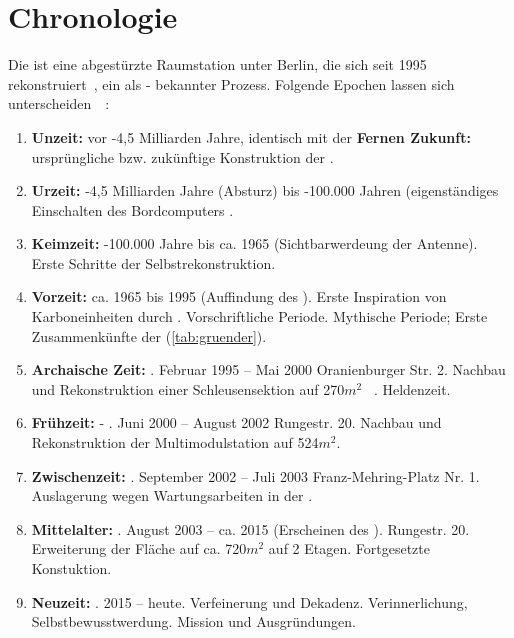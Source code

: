 \section*{Chronologie}

    Die  ist eine abgestürzte Raumstation unter Berlin, die sich seit 1995 rekonstruiert~\cite{cbasebook}, ein als  -  bekannter Prozess. Folgende Epochen lassen sich unterscheiden~\cite{cbasepressemap}~\cite{cbasebook}:
    \begin{enumerate}
        \item \textbf{Unzeit:} vor -4,5 Milliarden Jahre, identisch mit der \textbf{Fernen Zukunft:} ursprüngliche bzw. zukünftige Konstruktion der .
        
        \item \textbf{Urzeit: } -4,5 Milliarden Jahre (Absturz) bis -100.000 Jahren (eigenständiges Einschalten des Bordcomputers  \cite{cbasepressemap}.
        
        \item \textbf{Keimzeit:} -100.000 Jahre bis ca. 1965 (Sichtbarwerdeung der Antenne). Erste Schritte der Selbstrekonstruktion. 
        
        \item \textbf{Vorzeit:} ca. 1965 bis 1995 (Auffindung des ). Erste Inspiration von Karboneinheiten durch . Vorschriftliche Periode. Mythische Periode; Erste Zusammenkünfte der  (\cref{tab:gruender}).
        
        \item \textbf{Archaische Zeit:} .  Februar 1995 -- Mai 2000 Oranienburger Str. 2.  Nachbau und Rekonstruktion einer Schleusensektion auf 270$m^2$ \cite{cbasepressemap}~\cite{cbasebook}. Heldenzeit.
        
        \item \textbf{Frühzeit:} - .   Juni 2000 -- August 2002 Rungestr. 20.  Nachbau und Rekonstruktion der Multimodulstation  auf 524$m^2$.~\cite{cbasepressemap}~\cite{cbasebook} 
        
        \item \textbf{Zwischenzeit:} .  September 2002 -- Juli 2003 Franz-Mehring-Platz Nr. 1. 
        Auslagerung wegen Wartungsarbeiten in der .~\cite{cbasepressemap}~\cite{cbasebook} 
        
        \item \textbf{Mittelalter:}  . August 2003 -- ca. 2015 (Erscheinen des ). Rungestr. 20. 
         Erweiterung der Fläche auf ca. 720$m^2$ auf 2 Etagen. Fortgesetzte Konstuktion. \cite{cbasepressemap}~\cite{cbasebook} 
        
         \item \textbf{Neuzeit:} . 2015 -- heute. Verfeinerung und Dekadenz. Verinnerlichung, Selbstbewusstwerdung. Mission und Ausgründungen.
    \end{enumerate}


